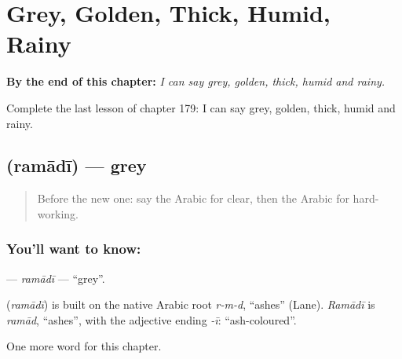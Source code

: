 
\chapter{Grey, Golden, Thick, Humid, Rainy}
\label{ch:ar-grey-golden-thick-humid-rainy}

\begin{chapteropening}
\textbf{By the end of this chapter:} \emph{I can say grey, golden, thick, humid and rainy.}

Complete the last lesson of chapter 179: I can say grey, golden, thick, humid and rainy.
\end{chapteropening}

\section[\texorpdfstring{\ar{رمادي} (ramādī)}{رمادي (ramādī)}]{ (ramādī) — grey}

\label{lesson:AR-C179-ramadi}



\begin{quote}
Before the new one: say the Arabic for clear, then the Arabic for hard-working.
\end{quote}

\subsection*{You'll want to know: }
\textbf{} — \emph{ramādī} — \textquotedblleft{}grey\textquotedblright{}.

\begin{cousinweb}
\textbf{} (\emph{ramādī}) is built on the native Arabic root \emph{r-m-d}, \textquotedblleft{}ashes\textquotedblright{} (Lane). \emph{Ramādī} is \emph{ramād}, \textquotedblleft{}ashes\textquotedblright{}, with the adjective ending \emph{-ī}: \textquotedblleft{}ash-coloured\textquotedblright{}.
\end{cousinweb}

\begin{grammarlens}[title={What you've built}]
One more word for this chapter.
\end{grammarlens}


